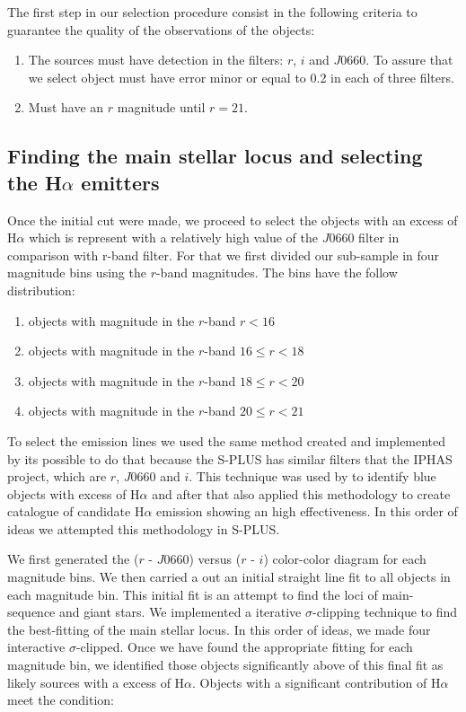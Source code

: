 \documentclass[fleqn,usenatbib]{mnras}
\begin{document}
The first step in our selection procedure consist in the following
criteria to guarantee the quality of the observations of the objects:

\begin{enumerate}
\item The sources must have detection in the filters: $r$, $i$ and
  $J$0660. To assure that we select object must have error minor or
  equal to 0.2 in each of three filters.

\item Must have an $r$ magnitude until $r = 21$.
  
\end{enumerate}

\subsection{Finding the main stellar locus and selecting the H{$\alpha$ emitters}}
\label{sec:}

Once the initial cut were made, we proceed to select the objects with
an excess of H{$\alpha$} which is represent with a relatively high value of
the  $J$0660 filter in comparison with r-band filter. For that we
first divided our sub-sample in four magnitude bins using the $r$-band
magnitudes. The bins have the follow distribution:

\begin{enumerate}
\item  objects with magnitude in the $r$-band $r < 16$
\item  objects with magnitude in the $r$-band $16 \leq r < 18$
\item  objects with magnitude in the $r$-band $18 \leq r < 20$
\item  objects with magnitude in the $r$-band $20 \leq r < 21$
  
\end{enumerate}

To select the emission lines we used the same method created and
implemented by \citet{Witham:2008} its possible to do that because
the S-PLUS has similar filters that the IPHAS project, which are
$r$, $J$0660 and $i$. This technique was used by \citet{Scaringi:2013}
to identify blue objects with excess of H{$\alpha$} and after that
\citet{Wevers:2017} also applied this methodology to create catalogue
of candidate H{$\alpha$} emission showing an high effectiveness. In this
order of ideas we attempted this methodology in S-PLUS.

We first generated the ($r$ - $J$0660) versus ($r$ - $i$) color-color
diagram for each magnitude bins. We then carried a out an initial straight
line fit to all objects in each magnitude bin. This initial fit is an
attempt to find the loci of main-sequence and giant stars. We implemented
a iterative $\sigma$-clipping technique to find the best-fitting of the main
stellar locus. In this order of ideas, we made four interactive $\sigma$-clipped.
Once we have found the appropriate fitting for each magnitude bin, we identified
those objects significantly above of this final fit as likely sources with
a excess of H{$\alpha$}. Objects with a significant contribution of
H{$\alpha$} meet the condition:
\end{document}
